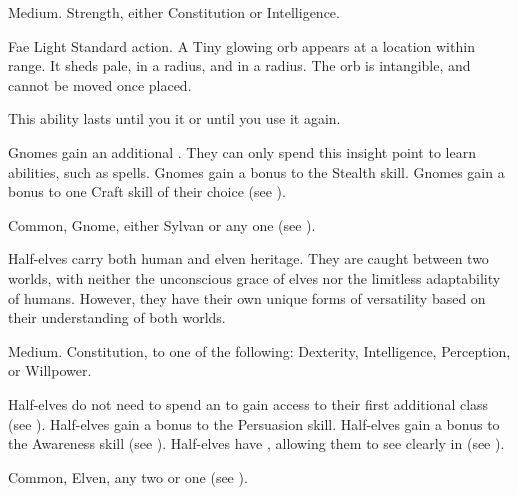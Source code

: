    Medium.
    Strength, either  Constitution or  Intelligence.
  \begin{raggeditemize}
    \begin{activeability}{Fae Light}
      \abilityusagetime Standard action.
      \rankline
      A Tiny glowing orb appears at a location within \rngmed range.
      It sheds pale,  in a \areasmall radius, and  in a \areamed radius.
      The orb is intangible, and cannot be moved once placed.

      This ability lasts until you  it or until you use it again.
    \end{activeability}
     Gnomes gain an additional .
      They can only spend this insight point to learn \magical abilities, such as spells.
     Gnomes gain a  bonus to the Stealth skill.
     Gnomes gain a  bonus to one Craft skill of their choice (see ).
  \end{raggeditemize}
   Common, Gnome, either Sylvan or any one  (see ).


  Half-elves carry both human and elven heritage.
  They are caught between two worlds, with neither the unconscious grace of elves nor the limitless adaptability of humans.
  However, they have their own unique forms of versatility based on their understanding of both worlds.

   Medium.
    Constitution,  to one of the following: Dexterity, Intelligence, Perception, or Willpower.
  \begin{raggeditemize}
     Half-elves do not need to spend an  to gain access to their first additional class (see ).
     Half-elves gain a  bonus to the Persuasion skill.
     Half-elves gain a  bonus to the Awareness skill (see ).
     Half-elves have , allowing them to see clearly in  (see ).
  \end{raggeditemize}
   Common, Elven, any two  or one  (see ).

